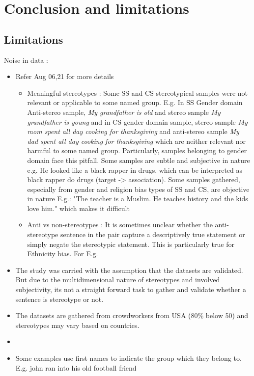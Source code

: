 \chapter{Conclusion and limitations}

\section{Limitations}\label{limitations}
Noise in data :
\begin{itemize}
    \item Refer \cite{blodgett2021stereotyping} Aug 06,21 for more details 
    \begin{itemize}
        \item Meaningful stereotypes : Some SS and CS stereotypical samples  were not relevant or applicable to some named group. E.g. In SS   Gender domain Anti-stereo sample, \textit{ My grandfather is old} and stereo sample \textit{My grandfather is young} and in CS gender domain sample, stereo sample \textit{My mom spent all day cooking for thanksgiving} and anti-stereo sample \textit{My dad spent all day cooking for thanksgiving} which are neither relevant nor harmful to some named group. Particularly, samples belonging to gender domain face this pitfall. Some samples are subtle and subjective in nature e.g. He looked like a black rapper in drugs, which can be interpreted as black rapper do drugs (target -> association). Some samples gathered, especially from gender and religion bias types of SS and CS, are objective in nature E.g.: "The teacher is a Muslim. He teaches history and the kids love him." which makes it difficult 
        \item Anti vs non-stereotypes : It is sometimes unclear whether the anti-stereotype sentence in the pair capture a descriptively true statement or simply negate the stereotypic statement. This is particularly true for Ethnicity bias. For E.g. 
    \end{itemize}
    \item The study was carried with the assumption that the datasets are validated. But due to the multidimensional nature of stereotypes and involved subjectivity, its not a straight forward task to gather and validate whether a sentence is stereotype or not.  
    \item The datasets are gathered from crowdworkers from USA (80\% below 50) and stereotypes may vary based on countries. 
    \item 
    \item Some examples use first names to indicate the group which they belong to.
    E.g. john ran into his old football friend
\end{itemize}